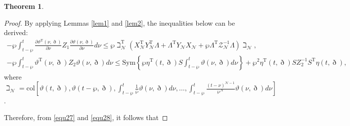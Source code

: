 \documentclass[preprint,review,fleqn,sort&compress,3p]{elsarticle}
\theoremstyle{definition}%
\newtheorem{thm}{Theorem}[section]
\begin{document}
\begin{thm}
\begin{proof}
		By applying Lemmas \ref{lem1} and \ref{lem2}, the inequalities below can be derived:
		\begin{align}\label{equ27}
			- \wp \int_{t-\wp}^t \frac{\partial \vartheta^\text{T}(\nu, \eth)}{\partial \nu} Z_1 \frac{\partial \vartheta(\nu, \eth)}{\partial \nu} d\nu \leq \wp \beth_\mathcal{N}^\text{T} \left( X_\mathcal{N}^\text{T} Y_\mathcal{N}^\text{T} \Lambda + \Lambda^\text{T} Y_\mathcal{N} X_\mathcal{N} + \wp \Lambda^\text{T} \mathcal{Z}_\mathcal{N}^{-1} \Lambda\right) \beth_\mathcal{N},
		\end{align}
		\begin{align}\label{equ28}
			- \wp \int_{t-\wp}^t \vartheta^\text{T}(\nu, \eth) Z_2 \vartheta(\nu, \eth) d\nu \leq \text{Sym} \left\{ \wp\eta^\text{T}(t, \eth)  S \int_{t-\wp}^t \vartheta(\nu, \eth) d\nu \right\}+ \wp^2\eta^\text{T}(t, \eth)  S Z_2^{-1} S^\text{T} \eta(t,\eth),
		\end{align}
		where $\beth_\mathcal{N} = \text{col} \left[\vartheta(t, \eth), \vartheta(t - \wp, \eth), \int_{t - \wp}^t \frac{1}{\wp} \vartheta(\nu, \eth) d\nu, \dots, \int_{t - \wp}^t \frac{(t - \nu)^{\mathcal{N} - 1}}{\wp^\mathcal{N}} \vartheta(\nu, \eth) d\nu \right]$.
		
		Therefore, from \eqref{equ27} and \eqref{equ28}, it follows that
		

\end{proof}
\end{thm}
\end{document}
